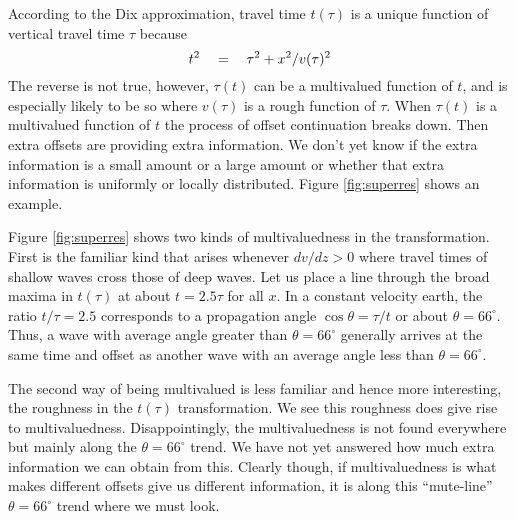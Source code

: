 According to the Dix approximation,
travel time $t(\tau)$ is a unique function of
vertical travel time $\tau$ because
\begin{equation}
t^2 \quad =\quad \tau^2 + x^2 / v(\tau)^2
\end{equation}
The reverse is not true, however,
$\tau(t)$ can be a multivalued function of $t$,
and is especially likely to be so
where $v(\tau)$ is a rough function of $\tau$.
When $\tau(t)$ is a multivalued function of $t$
the process of offset continuation breaks down.
Then extra offsets are providing extra information.
We don't yet know if the extra information is a small amount
or a large amount or whether that extra information
is uniformly or locally distributed.
Figure \ref{fig:superres} shows an example.


\par
Figure \ref{fig:superres} shows two kinds of multivaluedness
in the transformation.
First is the familiar kind that arises whenever $dv/dz > 0$
where travel times of shallow waves cross those of deep waves.
Let us place a line through the broad maxima in $t(\tau)$
at about $t=2.5\tau$ for all $x$.
In a constant velocity earth, the ratio $t/\tau=2.5$
corresponds to a propagation angle $\cos\theta = \tau/t$ or
about $\theta = 66^\circ$.
Thus, a wave with average angle greater than
$\theta = 66^\circ$
generally arrives at the same time and offset
as another wave with an average angle less than
$\theta = 66^\circ$.

\par
The second
way of being multivalued
is less familiar
and hence more interesting,
the roughness in the $t(\tau)$ transformation.
We see this roughness does give rise to multivaluedness.
Disappointingly, the multivaluedness
is not found everywhere but mainly along the
$\theta = 66^\circ$
trend.
We have not yet answered how much extra information we can obtain from this.
Clearly though, if multivaluedness is what makes different offsets
give us different information,
it is along this ``mute-line''
$\theta = 66^\circ$
trend where we must look.


